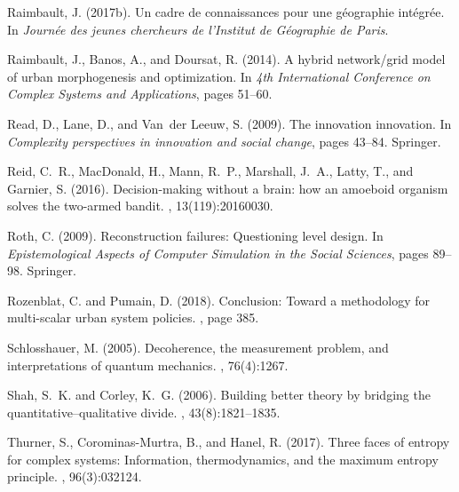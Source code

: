 \begin{thebibliography}{}
Raimbault, J. (2017b).
\newblock Un cadre de connaissances pour une g{\'e}ographie int{\'e}gr{\'e}e.
\newblock In {\em Journ{\'e}e des jeunes chercheurs de l'Institut de
  G{\'e}ographie de Paris}.

Raimbault, J., Banos, A., and Doursat, R. (2014).
\newblock A hybrid network/grid model of urban morphogenesis and optimization.
\newblock In {\em 4th International Conference on Complex Systems and
  Applications}, pages 51--60.

Read, D., Lane, D., and Van~der Leeuw, S. (2009).
\newblock The innovation innovation.
\newblock In {\em Complexity perspectives in innovation and social change},
  pages 43--84. Springer.

Reid, C.~R., MacDonald, H., Mann, R.~P., Marshall, J.~A., Latty, T., and
  Garnier, S. (2016).
\newblock Decision-making without a brain: how an amoeboid organism solves the
  two-armed bandit.
, 13(119):20160030.

Roth, C. (2009).
\newblock Reconstruction failures: Questioning level design.
\newblock In {\em Epistemological Aspects of Computer Simulation in the Social
  Sciences}, pages 89--98. Springer.

Rozenblat, C. and Pumain, D. (2018).
\newblock Conclusion: Toward a methodology for multi-scalar urban system
  policies.
,
  page 385.

Schlosshauer, M. (2005).
\newblock Decoherence, the measurement problem, and interpretations of quantum
  mechanics.
, 76(4):1267.

Shah, S.~K. and Corley, K.~G. (2006).
\newblock Building better theory by bridging the quantitative--qualitative
  divide.
, 43(8):1821--1835.

Thurner, S., Corominas-Murtra, B., and Hanel, R. (2017).
\newblock Three faces of entropy for complex systems: Information,
  thermodynamics, and the maximum entropy principle.
, 96(3):032124.


\end{thebibliography}
